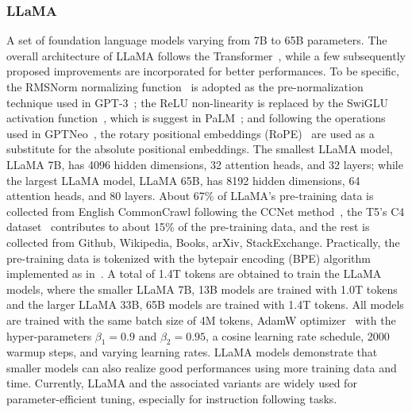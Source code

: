 \subsubsection{LLaMA~\cite{touvron2023llama}}
A set of foundation language models varying from 7B to 65B parameters. The overall architecture of LLaMA follows the Transformer~\cite{Transformers}, while a few subsequently proposed improvements are incorporated for better performances. To be specific, the RMSNorm normalizing function~\cite{rmsnorm} is adopted as the pre-normalization technique used in GPT-3~\cite{GPT-3}; the ReLU non-linearity is replaced by the SwiGLU activation function~\cite{shazeer2020glu}, which is suggest in PaLM~\cite{chowdhery2022palm}; and following the operations used in GPTNeo~\cite{black2022gpt}, the rotary positional embeddings (RoPE)~\cite{su2021roformer} are used as a substitute for the absolute positional embeddings. The smallest LLaMA model, LLaMA 7B, has 4096 hidden dimensions, 32 attention heads, and 32 layers; while the largest LLaMA model, LLaMA 65B, has 8192 hidden dimensions, 64 attention heads, and 80 layers. About 67\% of LLaMA's pre-training data is collected from English CommonCrawl following the CCNet method~\cite{wenzek2019ccnet}, the T5's C4 dataset~\cite{T5} contributes to about 15\% of the pre-training data, and the rest is collected from Github, Wikipedia, Books, arXiv, StackExchange. Practically, the pre-training data is tokenized with the bytepair encoding (BPE) algorithm~\cite{sennrich2015neural} implemented as in~\cite{kudo2018sentencepiece}. A total of 1.4T tokens are obtained to train the LLaMA models, where the smaller LLaMA 7B, 13B models are trained with 1.0T tokens and the larger LLaMA 33B, 65B models are trained with 1.4T tokens. All models are trained with the same batch size of 4M tokens, AdamW optimizer~\cite{loshchilov2017decoupled} with the hyper-parameters $\beta_{1}=0.9$ and $\beta_{2}=0.95$, a cosine learning rate schedule, 2000 warmup steps, and varying learning rates. LLaMA models demonstrate that smaller models can also realize good performances using more training data and time. Currently, LLaMA and the associated variants are widely used for parameter-efficient tuning, especially for instruction following tasks.
